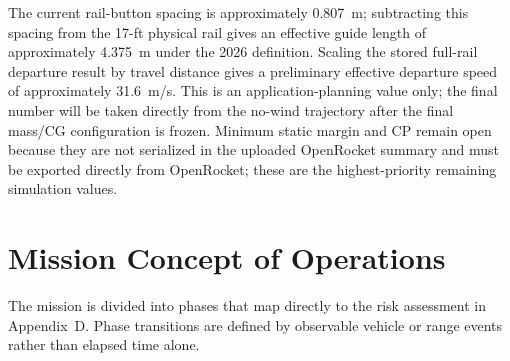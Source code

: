 \documentclass[10pt]{article}
\begin{document}
The current rail-button spacing is approximately \SI{0.807}{m}; subtracting this spacing from the 17-ft physical rail gives an effective guide length of approximately \SI{4.375}{m} under the 2026 definition. Scaling the stored full-rail departure result by travel distance gives a preliminary effective departure speed of approximately \SI{31.6}{m/s}. This is an application-planning value only; the final number will be taken directly from the no-wind trajectory after the final mass/CG configuration is frozen. Minimum static margin and CP remain open because they are not serialized in the uploaded OpenRocket summary and must be exported directly from OpenRocket; these are the highest-priority remaining simulation values.

\section{Mission Concept of Operations}
The mission is divided into phases that map directly to the risk assessment in Appendix~D. Phase transitions are defined by observable vehicle or range events rather than elapsed time alone.
\end{document}
